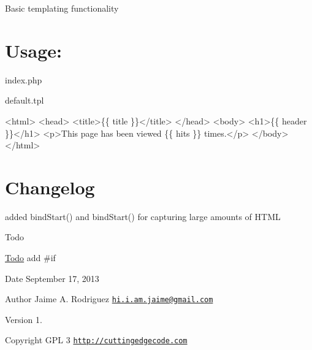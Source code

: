 Basic templating functionality\hypertarget{nav1_usage}{}\section{Usage\-:}\label{nav1_usage}
index.\-php 


default.\-tpl 
\begin{DoxyCode}
   <html>
   <head>
                  <title>\{\{ title \}\}</title>
   </head>
   <body>
                  <h1>\{\{ header \}\}</h1>
                  <p>This page has been viewed \{\{ hits \}\} times.</p>
   </body>
</html>
\end{DoxyCode}
\hypertarget{mailer1_changelog}{}\section{Changelog}\label{mailer1_changelog}

\begin{DoxyItemize}
\item added bind\-Start() and bind\-Start() for capturing large amounts of H\-T\-M\-L
\end{DoxyItemize}

\begin{DoxyRefDesc}{Todo}
\item[\hyperlink{todo__todo000001}{Todo}]add \#if\end{DoxyRefDesc}


\begin{DoxyDate}{Date}
September 17, 2013 
\end{DoxyDate}
\begin{DoxyAuthor}{Author}
Jaime A. Rodriguez \href{mailto:hi.i.am.jaime@gmail.com}{\tt hi.\-i.\-am.\-jaime@gmail.\-com} 
\end{DoxyAuthor}
\begin{DoxyVersion}{Version}
1. 
\end{DoxyVersion}
\begin{DoxyCopyright}{Copyright}
G\-P\-L 3 \href{http://cuttingedgecode.com}{\tt http\-://cuttingedgecode.\-com} 
\end{DoxyCopyright}
